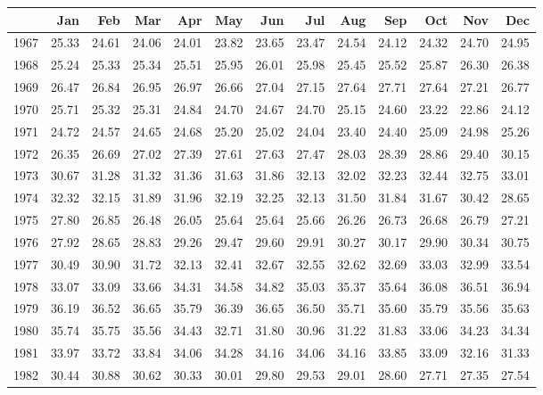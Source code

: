 \begin{longtable}{rrrrrrrrrrrrr}
  \hline
 & Jan & Feb & Mar & Apr & May & Jun & Jul & Aug & Sep & Oct & Nov & Dec \\ 
  \hline
1967 & 25.33 & 24.61 & 24.06 & 24.01 & 23.82 & 23.65 & 23.47 & 24.54 & 24.12 & 24.32 & 24.70 & 24.95 \\ 
  1968 & 25.24 & 25.33 & 25.34 & 25.51 & 25.95 & 26.01 & 25.98 & 25.45 & 25.52 & 25.87 & 26.30 & 26.38 \\ 
  1969 & 26.47 & 26.84 & 26.95 & 26.97 & 26.66 & 27.04 & 27.15 & 27.64 & 27.71 & 27.64 & 27.21 & 26.77 \\ 
  1970 & 25.71 & 25.32 & 25.31 & 24.84 & 24.70 & 24.67 & 24.70 & 25.15 & 24.60 & 23.22 & 22.86 & 24.12 \\ 
  1971 & 24.72 & 24.57 & 24.65 & 24.68 & 25.20 & 25.02 & 24.04 & 23.40 & 24.40 & 25.09 & 24.98 & 25.26 \\ 
  1972 & 26.35 & 26.69 & 27.02 & 27.39 & 27.61 & 27.63 & 27.47 & 28.03 & 28.39 & 28.86 & 29.40 & 30.15 \\ 
  1973 & 30.67 & 31.28 & 31.32 & 31.36 & 31.63 & 31.86 & 32.13 & 32.02 & 32.23 & 32.44 & 32.75 & 33.01 \\ 
  1974 & 32.32 & 32.15 & 31.89 & 31.96 & 32.19 & 32.25 & 32.13 & 31.50 & 31.84 & 31.67 & 30.42 & 28.65 \\ 
  1975 & 27.80 & 26.85 & 26.48 & 26.05 & 25.64 & 25.64 & 25.66 & 26.26 & 26.73 & 26.68 & 26.79 & 27.21 \\ 
  1976 & 27.92 & 28.65 & 28.83 & 29.26 & 29.47 & 29.60 & 29.91 & 30.27 & 30.17 & 29.90 & 30.34 & 30.75 \\ 
  1977 & 30.49 & 30.90 & 31.72 & 32.13 & 32.41 & 32.67 & 32.55 & 32.62 & 32.69 & 33.03 & 32.99 & 33.54 \\ 
  1978 & 33.07 & 33.09 & 33.66 & 34.31 & 34.58 & 34.82 & 35.03 & 35.37 & 35.64 & 36.08 & 36.51 & 36.94 \\ 
  1979 & 36.19 & 36.52 & 36.65 & 35.79 & 36.39 & 36.65 & 36.50 & 35.71 & 35.60 & 35.79 & 35.56 & 35.63 \\ 
  1980 & 35.74 & 35.75 & 35.56 & 34.43 & 32.71 & 31.80 & 30.96 & 31.22 & 31.83 & 33.06 & 34.23 & 34.34 \\ 
  1981 & 33.97 & 33.72 & 33.84 & 34.06 & 34.28 & 34.16 & 34.06 & 34.16 & 33.85 & 33.09 & 32.16 & 31.33 \\ 
  1982 & 30.44 & 30.88 & 30.62 & 30.33 & 30.01 & 29.80 & 29.53 & 29.01 & 28.60 & 27.71 & 27.35 & 27.54 \\ 

\end{longtable}

